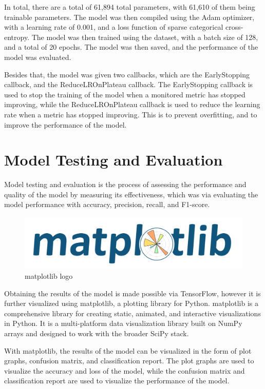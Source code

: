 In total, there are a total of 61,894 total parameters, with 61,610 of them being trainable parameters. The model was then compiled using the Adam optimizer, with a learning rate of 0.001, and a loss function of sparse categorical cross-entropy. The model was then trained using the dataset, with a batch size of 128, and a total of 20 epochs. The model was then saved, and the performance of the model was evaluated.

Besides that, the model was given two callbacks, which are the EarlyStopping callback, and the ReduceLROnPlateau callback. The EarlyStopping callback is used to stop the training of the model when a monitored metric has stopped improving, while the ReduceLROnPlateau callback is used to reduce the learning rate when a metric has stopped improving. This is to prevent overfitting, and to improve the performance of the model.


\newpage
\section{Model Testing and Evaluation}
Model testing and evaluation is the process of assessing the performance and quality of the model by measuring its effectiveness, which was via evaluating the model performance with accuracy, precision, recall, and F1-score. 

\begin{figure}[h]
    \centering
    \includegraphics[scale=0.3]{mainmatter/images/research methodology/matplotlib.png}
    \caption{matplotlib logo}
    \label{fig:matplotlib}
\end{figure}

Obtaining the results of the model is made possible via TensorFlow, however it is further visualized using matplotlib, a plotting library for Python. matplotlib is a comprehensive library for creating static, animated, and interactive visualizations in Python. It is a multi-platform data visualization library built on NumPy arrays and designed to work with the broader SciPy stack. 

With matplotlib, the results of the model can be visualized in the form of plot graphs, confusion matrix, and classification report. The plot graphs are used to visualize the accuracy and loss of the model, while the confusion matrix and classification report are used to visualize the performance of the model.



